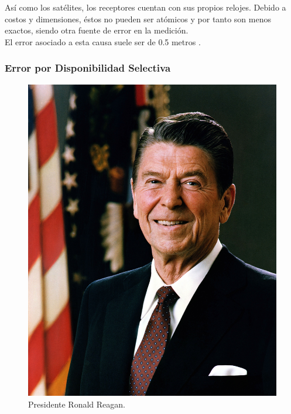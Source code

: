 Así como los satélites, los receptores cuentan con sus propios relojes. Debido a costos y dimensiones, éstos no pueden ser atómicos y por tanto son menos exactos, siendo otra fuente de error en la medición.\\

El error asociado a esta causa suele ser de 0.5 metros \cite{fallas2002sistema}.

\subsubsection{Error por Disponibilidad Selectiva}

\begin{figure}[!ht]
\centering
\includegraphics[scale=0.30]{Figures/RonaldReagan}
\caption[Presidente Ronald Reagan.]{Presidente Ronald Reagan\footnotemark.}
\label{fig:ErrDis}
\end{figure}


